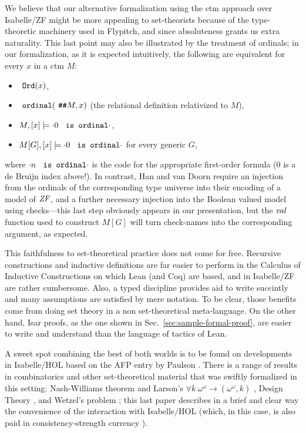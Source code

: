 We believe that our alternative formalization using the ctm approach
over Isabelle/ZF might be more appealing to set-theorists because of the
type-theoretic machinery used in Flypitch, and %
since absoluteness grants us extra naturality. This last point may also
be illustrated by the treatment of ordinals; in our formalization, as
it is expected intuitively, the following are equivalent for every $x$
in a ctm $M$:
\begin{itemize}
\item $\isatt{Ord}(x)$,
\item $\isatt{ordinal}(\isatt{\#\#}M,x)$ (the relational
  definition relativized to $M$),
\item
  $M,[x] \models {\cdot}0\isatt{ is ordinal}{\cdot}$,
\item
  $M[G], [x] \models {\cdot}0\isatt{ is ordinal}{\cdot}$ for every generic $G$,
\end{itemize}
where ${\cdot}n\isatt{ is ordinal}{\cdot}$ is the code for the
appropriate first-order formula  ($0$ is a de
Bruijn index above!). In contrast, Han and van Doorn require an
injection from the ordinals of the corresponding type universe into
their encoding of a model of $\mathit{ZF}$, and a further necessary injection into the Boolean
valued model using checks---this last step obviously appears in our
presentation, but the $\operatorname{\mathit{val}}$ function used to construct $M[G]$ will turn
check-names into the corresponding argument, as expected.

This faithfulness to set-theoretical practice does not come for
free. Recursive constructions and inductive definitions are far easier
to perform in the Calculus of Inductive Constructions on which Lean
(and Coq) are based, and in Isabelle/ZF are rather cumbersome. Also, a
typed discipline provides aid to write succintly and many assumptions
are satisfied by mere notation. To be clear, those benefits come from
doing set theory in a non set-theoretical meta-language. On the other
hand, Isar proofs, as the one shown in
Sec.~\ref{sec:sample-formal-proof}, are easier to write and understand
than the language of tactics of Lean.

A sweet spot combining the best of both worlds is to be found on
developments in Isabelle/HOL based on the AFP entry
 by Paulson \cite{ZFC_in_HOL-AFP}. There is a
range of results in combinatorics and other set-theoretical material
that was swiftly formalized in this setting: Nash-Williams theorem and
Larson's $\forall k\ \omega^{\omega}\longrightarrow(\omega^\omega,k)$
\cite{doi:10.1080/10586458.2021.1980464}, Design Theory
\cite{10.1007/978-3-030-81097-9_1}, and Wetzel's problem
\cite{2022arXiv220503159P}; this last paper describes in a brief and
clear way the convenience of the interaction with Isabelle/HOL
(which, in this case, is also paid in consistency-strength currency
\cite[Sect.~3]{DBLP:conf/ictac/Obua06}).

